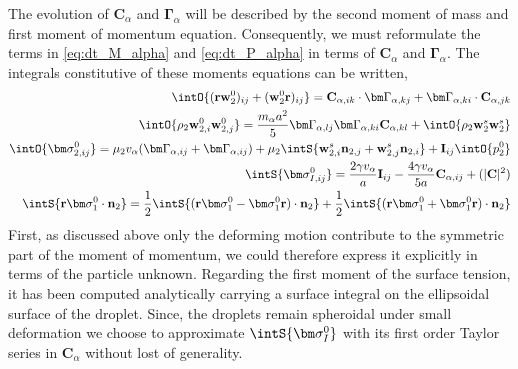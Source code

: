 The evolution of $\textbf{C}_\alpha$ and $\bm\Gamma_\alpha$ will be described by the second moment of mass and first moment of momentum equation.
Consequently, we must reformulate the terms in \ref{eq:dt_M_alpha} and \ref{eq:dt_P_alpha} in terms of $\textbf{C}_\alpha$ and $\bm\Gamma_\alpha$. 
The integrals constitutive of these moments equations can be written, 
\begin{align}
    \intO{(\textbf{rw}_2^0 )_{ij}+ (\textbf{w}_2^0 \textbf{r})_{ij}} 
    = \textbf{C}_{\alpha,ik} \cdot \bm\Gamma_{\alpha,kj}
    +  \bm\Gamma_{\alpha,ki} \cdot \textbf{C}_{\alpha,jk}
    \\
    \intO{\rho_2 \textbf{w}_{2,i}^0\textbf{w}_{2,j}^0}
    = \frac{m_\alpha a^2}{5}
        \bm\Gamma_{\alpha,lj}\bm\Gamma_{\alpha,ki} \textbf{C}_{\alpha,kl} 
        + \intO{\rho_2\textbf{w}^s_2\textbf{w}^s_2}
    \\
    \label{eq:sigma_2_def}
    \intO{\bm\sigma_{2,ij}^0}
    =
    \mu_2 v_\alpha (\bm\Gamma_{\alpha,ij} + \bm\Gamma_{\alpha,ij})
    + \mu_2 \intS{\textbf{w}^s_{2,i}\textbf{n}_{2,j}+ \textbf{w}^s_{2,j}\textbf{n}_{2,i}}
    + \textbf{I}_{ij}\intO{p_2^0} 
    \\
    \label{eq:sigma_I_def}
    \intS{\bm\sigma_{I,ij}^0}
    = \frac{2 \gamma v_\alpha }{a} \textbf{I}_{ij} - \frac{4 \gamma v_\alpha }{5 a} \textbf{C}_{\alpha,ij}
    +\mathcal(|\textbf{C}|^2)\\
    \intS{\textbf{r}\bm\sigma_1^0\cdot \textbf{n}_2}
    = 
    \frac{1}{2}\intS{(\textbf{r}\bm\sigma_1^0-\bm\sigma_1^0\textbf{r})\cdot \textbf{n}_2}
    + \frac{1}{2}\intS{(\textbf{r}\bm\sigma_1^0+\bm\sigma_1^0\textbf{r})\cdot \textbf{n}_2}
\end{align}
First, as discussed above only the deforming motion contribute to the symmetric part of the moment of momentum, we could therefore express it explicitly in terms of the particle unknown. 
Regarding the first moment of the surface tension, it has been computed analytically carrying a surface integral on the ellipsoidal surface of the droplet. 
Since, the droplets remain spheroidal under small deformation we choose to approximate $\intS{\bm\sigma_I^0}$ with its first order Taylor series in $\textbf{C}_\alpha$ without lost of generality.
